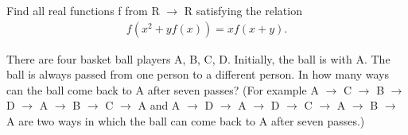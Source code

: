 \item Find all real functions f from R $\to$ R satisfying the relation
\begin{align*}
f (x^{2} + yf (x)) = xf (x + y).
\end{align*}

\item There are four basket ball players A, B, C, D. Initially, the ball is with A. The ball is always passed from one person to a different person. In how many ways can the ball come back to A after seven
passes? (For example A $\to$ C $\to$ B $\to$ D $\to$ A $\to$ B $\to$ C $\to$ A and A $\to$ D $\to$ A $\to$ D $\to$ C $\to$ A $\to$ B $\to$ A are two ways in which the ball can come back to A after seven passes.)



